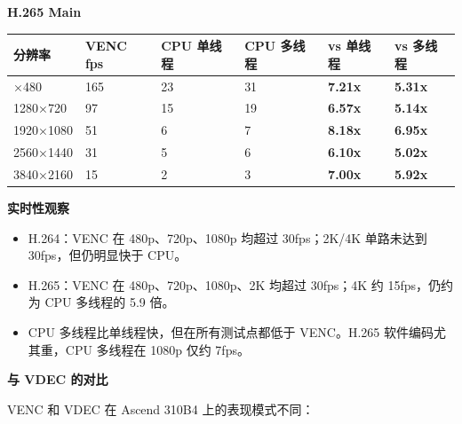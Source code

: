\textbf{H.265 Main}

\begin{longtable}[]{@{}llllll@{}}
\toprule\noalign{}
分辨率 & VENC fps & CPU 单线程 & CPU 多线程 & vs 单线程 & vs 多线程 \\
\midrule\noalign{}
\endhead
\bottomrule\noalign{}
\endlastfoot
640×480 & 165 & 23 & 31 & \textbf{7.21x} & \textbf{5.31x} \\
1280×720 & 97 & 15 & 19 & \textbf{6.57x} & \textbf{5.14x} \\
1920×1080 & 51 & 6 & 7 & \textbf{8.18x} & \textbf{6.95x} \\
2560×1440 & 31 & 5 & 6 & \textbf{6.10x} & \textbf{5.02x} \\
3840×2160 & 15 & 2 & 3 & \textbf{7.00x} & \textbf{5.92x} \\
\end{longtable}

\textbf{实时性观察}

\begin{itemize}
\tightlist
\item
  H.264：VENC 在 480p、720p、1080p 均超过 30fps；2K/4K 单路未达到
  30fps，但仍明显快于 CPU。
\item
  H.265：VENC 在 480p、720p、1080p、2K 均超过 30fps；4K 约 15fps，仍约为
  CPU 多线程的 5.9 倍。
\item
  CPU 多线程比单线程快，但在所有测试点都低于 VENC。H.265
  软件编码尤其重，CPU 多线程在 1080p 仅约 7fps。
\end{itemize}

\textbf{与 VDEC 的对比}

VENC 和 VDEC 在 Ascend 310B4 上的表现模式不同：

